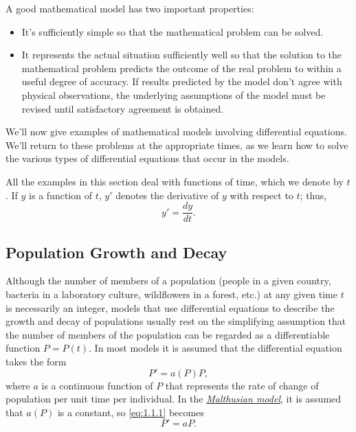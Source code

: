 \documentclass{ximera}
\begin{document}
A good mathematical model has two important properties:

\begin{itemize}
\item It's sufficiently simple so that the mathematical problem
can be solved.

\item It represents the actual situation sufficiently well so that the
solution to the mathematical problem predicts the outcome of the real
problem to within a useful degree of accuracy. If results predicted by
the model don't agree with physical observations, the
underlying
assumptions of the model must be revised until satisfactory agreement
is obtained.
\end{itemize}

We'll  now give  examples of mathematical models involving
differential equations. We'll return to these problems at the
appropriate times, as we learn how to solve the various types of
differential equations that occur in the models.

All the examples in this section deal with functions of time, which we
 denote by $t$. If $y$ is a function of $t$,  $y'$
denotes the derivative of $y$ with respect to $t$;   thus,
$$
y'=\frac{dy}{dt}.
$$


\subsection*{Population Growth and Decay}

Although the number of members of a population (people in a given
country, bacteria in a laboratory culture, wildflowers in a forest,
etc.)
at any given time $t$ is necessarily an integer, models that use
differential equations to describe the growth and decay of populations
usually rest on the simplifying assumption that the number of members of
the population can be regarded as a differentiable function $P=P(t)$.
In most models it is assumed that the differential equation takes the
form
\begin{equation} \label{eq:1.1.1}
P'=a(P)P,
\end{equation}
where $a$ is a continuous function of $P$ that represents the rate of
change of population per unit time per individual.
In the
\href{http://en.wikipedia.org/wiki/Thomas_Robert_Malthus}
{\textit{Malthusian model}},
 it is assumed that
$a(P)$ is a constant, so \eqref{eq:1.1.1} becomes
\begin{equation} \label{eq:1.1.2}
P'=aP.
\end{equation}
\end{document}
